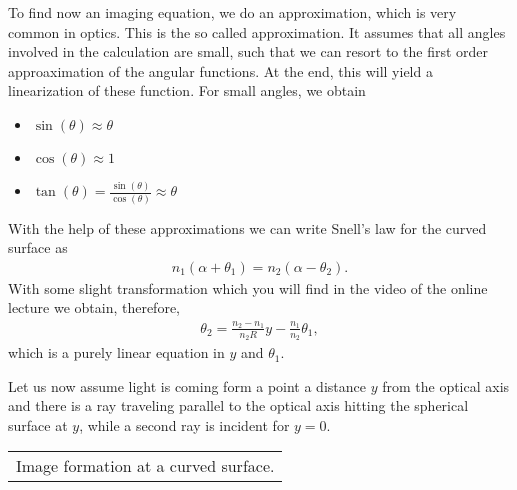 \documentclass[letterpaper,10pt,english]{sphinxmanual}
\begin{document}
To find now an imaging equation, we do an approximation, which is very common in optics. This is the so called  approximation. It assumes that all angles involved in the calculation are small, such that we can resort to the first order approaximation of the angular functions. At the end, this will yield a linearization of these function. For small angles, we obtain
\begin{itemize}
\item {} 
\(\sin(\theta)\approx \theta\)

\item {} 
\(\cos(\theta)\approx 1\)

\item {} 
\(\tan(\theta)=\frac{\sin(\theta)}{\cos(\theta)}\approx \theta\)

\end{itemize}

With the help of these approximations we can write Snell’s law for the curved surface as
\begin{equation*}
\begin{split}n_1(\alpha+\theta_1)=n_2(\alpha-\theta_2).\end{split}
\end{equation*}
With some slight transformation which you will find in the video of the online lecture we obtain, therefore,
\begin{equation*}
\begin{split}\theta_2=\frac{n_2-n_1}{n_2 R}y -\frac{n_1}{n_2}\theta_1,\end{split}
\end{equation*}
which is a purely linear equation in \(y\) and \(\theta_1\).

Let us now assume light is coming form a point a distance \(y\) from the optical axis and there is a ray traveling parallel to the optical axis hitting the spherical surface at \(y\), while a second ray is incident for \(y=0\).


\begin{savenotes}\sphinxattablestart
\centering
\begin{tabulary}{\linewidth}[t]{|T|}
\hline
\sphinxstyletheadfamily 
{}
\\
\hline
{} Image formation at a curved surface.
\\
\hline
\end{tabulary}
\par
\sphinxattableend\end{savenotes}
\end{document}
